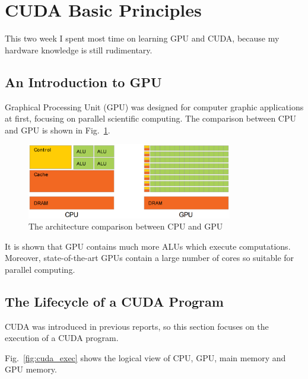 \documentclass[11pt]{article}
\begin{document}
\section{CUDA Basic Principles}

This two week I spent most time on learning GPU and CUDA, because my hardware knowledge is still rudimentary.

\subsection{An Introduction to GPU}

Graphical Processing Unit (GPU) was designed for computer graphic applications at first, focusing on parallel scientific computing. The comparison between CPU and GPU is shown in Fig.~\ref{fig:gpuvscpu}.

\begin{figure}[h]
    \centering
    \includegraphics[width=0.8\textwidth]{gpuvscpu.eps}
    \caption{The architecture comparison between CPU and GPU}
    \label{fig:gpuvscpu}
\end{figure}

It is shown that GPU contains much more ALUs which execute computations. Moreover, state-of-the-art GPUs contain a large number of cores so suitable for parallel computing. 

\subsection{The Lifecycle of a CUDA Program}

CUDA was introduced in previous reports, so this section focuses on the execution of a CUDA program.

Fig.~\ref{fig:cuda_exec} shows the logical view of CPU, GPU, main memory and GPU memory.
\end{document}
